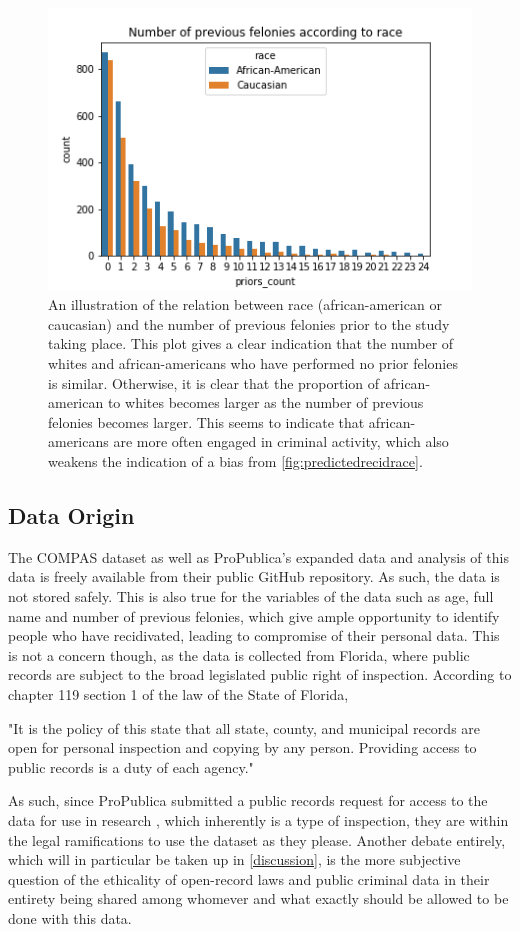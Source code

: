\documentclass[11pt, fleqn, titlepage]{article}
\begin{document}
	\begin{figure}[H]
		\centering
		\includegraphics[width=0.5\linewidth]{imgs/proirs}
		\caption{An illustration of the relation between race (african-american or caucasian) and the number of previous felonies prior to the study taking place. This plot gives a clear indication that the number of whites and african-americans who have performed no prior felonies is similar. Otherwise, it is clear that the proportion of african-american to whites becomes larger as the number of previous felonies becomes larger. This seems to indicate that african-americans are more often engaged in criminal activity, which also weakens the indication of a bias from \ref{fig:predictedrecidrace}.}
		\label{fig:proirs}
	\end{figure}
	
	
	
	\subsection{Data Origin}
	The COMPAS dataset as well as ProPublica's expanded data and analysis of this data is freely available from their public GitHub repository. As such, the data is not stored safely. This is also true for the variables of the data such as age, full name and number of previous felonies, which give ample opportunity to identify people who have recidivated, leading to compromise of their personal data. This is not a concern though, as the data is collected from Florida, where public records are subject to the broad legislated public right of inspection. According to chapter 119 section 1 of the law of the State of Florida, 
	\begin{displayquote}
		"It is the policy of this state that all state, county, and municipal records are open for personal inspection and copying by any person. Providing access to public records is a duty of each agency." \cite{floridaLaw}
	\end{displayquote}
	
	\noindent As such, since ProPublica submitted a public records request for access to the data for use in research \cite{propublicaAnalysis}, which inherently is a type of inspection, they are within the legal ramifications to use the dataset as they please. Another debate entirely, which will in particular be taken up in \ref{discussion}, is the more subjective question of the ethicality of open-record laws and public criminal data in their entirety being shared among whomever and what exactly should be allowed to be done with this data.
	
\end{document}
